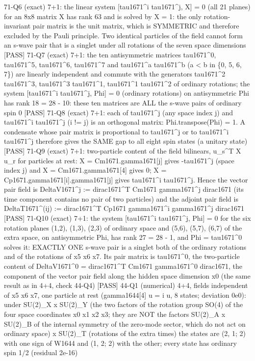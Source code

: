 \documentclass[
  10pt,
]{article}
\newenvironment{Shaded}{}{}
\newcommand{\NormalTok}[1]{#1}
\begin{document}
\begin{Shaded}
\begin{Highlighting}[]
\NormalTok{[PASS] 71{-}Q6  (exact) 7+1: the linear system [tau1671\^{}i tau1671\^{}j, X] = 0 (all 21 planes) for an 8x8 matrix X has rank 63 and is solved by X = 1: the only rotation{-}invariant pair matrix is the unit matrix, which is SYMMETRIC and therefore excluded by the Pauli principle.  Two identical particles of the field cannot form an s{-}wave pair that is a singlet under all rotations of the seven space dimensions}
\NormalTok{[PASS] 71{-}Q7  (exact) 7+1: the ten antisymmetric matrices tau1671\^{}0, tau1671\^{}5, tau1671\^{}6, tau1671\^{}7 and tau1671\^{}a tau1671\^{}b (a \textless{} b in \{0, 5, 6, 7\}) are linearly independent and commute with the generators tau1671\^{}2 tau1671\^{}3, tau1671\^{}3 tau1671\^{}1, tau1671\^{}1 tau1671\^{}2 of ordinary rotations; the system [tau1671\^{}i tau1671\^{}j, Phi] = 0 (ordinary rotations) on antisymmetric Phi has rank 18 = 28 {-} 10: these ten matrices are ALL the s{-}wave pairs of ordinary spin 0}
\NormalTok{[PASS] 71{-}Q8  (exact) 7+1: each of tau1671\^{}j (any space index j) and tau1671\^{}i tau1671\^{}j (i != j) is an orthogonal matrix: Phi.transpose(Phi) = 1.  A condensate whose pair matrix is proportional to tau1671\^{}j or to tau1671\^{}i tau1671\^{}j therefore gives the SAME gap to all eight spin states (a \textquotesingle{}unitary\textquotesingle{} state)}
\NormalTok{[PASS] 71{-}Q9  (exact) 7+1: two{-}particle content of the field bilinears, u\_s\^{}T X u\_r for particles at rest: X = Cm1671.gamma1671[j] gives {-}tau1671\^{}j (space index j) and X = Cm1671.gamma1671[4] gives 0; X = Cp1671.gamma1671[i].gamma1671[j] gives tau1671\^{}i tau1671\^{}j.  Hence the vector pair field is DeltaV1671\^{}j := dirac1671\^{}T Cm1671 gamma1671\^{}j dirac1671 (its time component contains no pair of two particles) and the adjoint pair field is DeltaT1671\^{}(ij) := dirac1671\^{}T Cp1671 gamma1671\^{}i gamma1671\^{}j dirac1671}
\NormalTok{[PASS] 71{-}Q10  (exact) 7+1: the system [tau1671\^{}i tau1671\^{}j, Phi] = 0 for the six rotation planes (1,2), (1,3), (2,3) of ordinary space and (5,6), (5,7), (6,7) of the extra space, on antisymmetric Phi, has rank 27 = 28 {-} 1, and Phi = tau1671\^{}0 solves it: EXACTLY ONE s{-}wave pair is a singlet both of the ordinary rotations and of the rotations of x5 x6 x7.  Its pair matrix is tau1671\^{}0, the two{-}particle content of DeltaV1671\^{}0 = dirac1671\^{}T Cm1671 gamma1671\^{}0 dirac1671, the component of the vector pair field along the hidden space dimension x0 (the same result as in 4+4, check 44{-}Q4)}
\NormalTok{[PASS] 44{-}Q1  (numerical) 4+4, fields independent of x5 x6 x7, one particle at rest (gamma1644[4] u = i u, 8 states; deviation 0e0): under SU(2)\_X x SU(2)\_Y (the two factors of the rotation group SO(4) of the four space coordinates x0 x1 x2 x3; they are NOT the factors SU(2)\_A x SU(2)\_B of the internal symmetry of the zero{-}mode sector, which do not act on ordinary space) x SU(2)\_T (rotations of the extra times) the states are (2, 1; 2) with one sign of W1644 and (1, 2; 2) with the other; every state has ordinary spin 1/2 (residual 2e{-}16)}

\end{Highlighting}
\end{Shaded}
\end{document}
